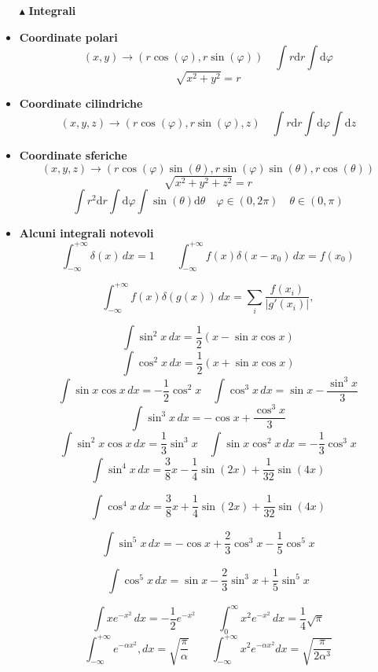 \documentclass{book}
\newcommand{\g}{\textbf}
\newcommand{\e}{\begin{equation}}
\newcommand{\ex}{\end{equation} }
\renewcommand{\it}{\item[$\cdot$]}
\begin{document}
\begin{multicols}{4}
\begin{itemize}
\item [$\blacktriangle$] \g{Integrali}
\it \g{Coordinate polari}
\e{(x,y) \rightarrow (r\cos(\varphi), r\sin(\varphi)) \quad \int r \text{d}r\int \text{d}\varphi}\ex
\e{\sqrt{x^{2}+y^{2}} = r}\ex
\it \g{Coordinate cilindriche}
\e{(x,y,z) \rightarrow (r\cos(\varphi),r\sin(\varphi),z) \quad \int r \text{d}r\int \text{d}\varphi\int \text{d}z }\ex
\it \g{Coordinate sferiche}
\e{(x,y,z) \rightarrow (r\cos(\varphi)\sin(\theta),r\sin(\varphi)\sin(\theta),r\cos(\theta))  }\ex
\e{\sqrt{x^{2}+y^{2}+z^{2}} = r}\ex
\e{\int r^{2} \text{d}r\int \text{d}\varphi\int \sin(\theta)\text{d}\theta \quad \varphi \in (0,2\pi) \quad \theta \in (0,\pi)}\ex
    \it \g{Alcuni integrali notevoli}
    \begin{equation}
\int_{-\infty}^{+\infty} \delta(x) \, dx = 1 \qquad
\int_{-\infty}^{+\infty} f(x) \delta(x - x_0) \, dx = f(x_0)
\end{equation}

\begin{equation}
\int_{-\infty}^{+\infty} f(x) \delta(g(x)) \, dx = \sum_{i} \frac{f(x_i)}{|g'(x_i)|},
\end{equation}

        \e{\int \sin^2x \, dx = \frac{1}{2}(x - \sin x \cos x)} \ex
        \e{\int \cos^2x \, dx = \frac{1}{2}(x + \sin x \cos x) }\ex \e{ \int \sin x \cos x \, dx = -\frac{1}{2}\cos^2x \quad \int \cos^3x \, dx = \sin x - \frac{\sin^3x}{3}} \ex
        \e{\int \sin^3x \, dx = -\cos x + \frac{\cos^3x}{3}} \ex
        \e{\int \sin^2x \cos x \, dx = \frac{1}{3}\sin^3x \quad \int \sin x \cos^2x \, dx = -\frac{1}{3}\cos^3x} \ex
        \begin{equation}
\int \sin^4 x \, dx = \frac{3}{8}x - \frac{1}{4}\sin(2x) + \frac{1}{32}\sin(4x) 
\end{equation}

\begin{equation}
\int \cos^4 x \, dx = \frac{3}{8}x + \frac{1}{4}\sin(2x) + \frac{1}{32}\sin(4x) 
\end{equation}

\begin{equation}
\int \sin^5 x \, dx = -\cos x + \frac{2}{3}\cos^3 x - \frac{1}{5}\cos^5 x 
\end{equation}

\begin{equation}
\int \cos^5 x \, dx = \sin x - \frac{2}{3}\sin^3 x + \frac{1}{5}\sin^5 x 
\end{equation}

        \e{\int x e^{-x^2} \, dx = -\frac{1}{2} e^{-x^2} \qquad \int_0^\infty x^2 e^{-x^2} \, dx = \frac{1}{4} \sqrt{\pi}} \ex
       \e{ \int_{-\infty}^{+\infty} e^{-\alpha x^2} , dx = \sqrt{\frac{\pi}{\alpha}} \qquad \int_{-\infty}^{+\infty} x^2 e^{-\alpha x^2} dx = \sqrt{\frac{\pi}{2\alpha^3}} }\ex


\end{itemize}
\end{multicols}
\end{document}
